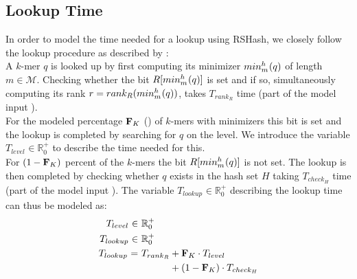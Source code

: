 \documentclass[a4paper,titlepage,onecolumn,oneside,12pt,nenglish,titlepage=firstiscover]{scrbook}
\theoremstyle{plain} %
\theoremstyle{definition} %
\theoremstyle{remark} %
\theoremstyle{plain}
\newcommand{\RR}{\mathbb{R}} %
\newcommand{\minimizerLength}{m}
\newcommand{\kmer}{q}
\newcommand{\contains}{rank}
\newcommand{\rank}{rank}
\newcommand{\timeForOperationOnStructure}[2]{T_{#1_{#2}}} %
\newcommand{\possibleMinimizerLengths}{\mathcal{M}}
\begin{document}
\subsection{Lookup Time}
In order to model the time needed for a lookup using RSHash, we closely follow the lookup procedure as described by \citet{schulte-mattler_rshash_2026}:\\
A $k$-mer $\kmer$ is looked up by first computing its minimizer $\minimizerOf{\kmer}{}$ of length $\minimizerLength \in \possibleMinimizerLengths$. Checking whether the bit $R[\minimizerOf{\kmer}{}]$ is set and if so, simultaneously computing its rank $r = \rank_R(\minimizerOf{\kmer}{})$, takes $\timeForOperationOnStructure{\contains}{R}$ time (part of the model input ).\\
For the modeled percentage $\textbf{F}_{K}$ () of $k$-mers with \infrequent minimizers this bit is set and the lookup is completed by searching for $\kmer$ on the level. We introduce the variable $\timeForOperationOnStructure{level}{} \in \RR^+_0$ to describe the time needed for this.\\
For $(1-\textbf{F}_{K})$ percent of the $k$-mers the bit $R[\minimizerOf{\kmer}{}]$ is not set. The lookup is then completed by checking whether $q$ exists in the hash set $H$ taking $\timeForOperationOnStructure{check}{H}$ time (part of the model input ). The variable $\timeForOperationOnStructure{lookup}{} \in \RR^+_0$ describing the lookup time can thus be modeled as:
\newcommand{\lookupTimeExpression}{
	\nonumber \timeForOperationOnStructure{lookup}{} =&~ \timeForOperationOnStructure{\contains}{R} + \varCDF{K} \cdot \timeForOperationOnStructure{level}{}\\
	&~\phantom{\timeForOperationOnStructure{\contains}{R}}+ (1-\varCDF{K}) \cdot \timeForOperationOnStructure{check}{H}}
\begin{align}
	\timeForOperationOnStructure{level}{} \in&~ \RR^+_0 \label{variable:levelTime}\\
	\timeForOperationOnStructure{lookup}{} \in&~ \RR^+_0 \label{variable:lookupTime}\\
	\lookupTimeExpression \label{constraint:lookupTime}
\end{align}
\end{document}
